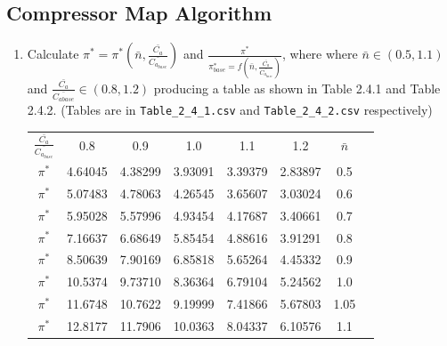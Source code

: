 \documentclass[titlepage]{article}
\begin{document}
\subsection{Compressor Map Algorithm}
\begin{enumerate}
    \item Calculate $\pi^{*} = \pi^{*} (\bar{n}, \frac{\bar{C_{a}}}{\bar{C_{a_{base}}}})$ and $\frac{\pi^{*}}{\pi^{*}_{base} = f (\bar{n}, \frac{\bar{C_{a}}}{\bar{C_{a_{base}}}})}$, where where $\bar{n} \in (0.5, 1.1)$ and $\frac{\bar{C_a}}{\bar{C_{a base}}} \in (0.8, 1.2)$ producing a table as shown in Table 2.4.1 and Table 2.4.2. (Tables are in \verb|Table_2_4_1.csv| and \verb|Table_2_4_2.csv| respectively)
    \begin{center}
        \begin{tabular}{ c c c c c c c c }
            $\frac{\bar{C_{a}}}{\bar{C_{a_{base}}}}$ & 0.8 & 0.9 & 1.0 & 1.1 & 1.2 & $\bar{n}$ \\
            $\pi^{*}$ & 4.64045 & 4.38299 & 3.93091 & 3.39379 & 2.83897 & 0.5 \\
            $\pi^{*}$ & 5.07483 & 4.78063 & 4.26545 & 3.65607 & 3.03024 & 0.6 \\
            $\pi^{*}$ & 5.95028 & 5.57996 & 4.93454 & 4.17687 & 3.40661 & 0.7 \\
            $\pi^{*}$ & 7.16637 & 6.68649 & 5.85454 & 4.88616 & 3.91291 & 0.8 \\
            $\pi^{*}$ & 8.50639 & 7.90169 & 6.85818 & 5.65264 & 4.45332 & 0.9 \\
            $\pi^{*}$ & 10.5374 & 9.73710 & 8.36364 & 6.79104 & 5.24562 & 1.0 \\
            $\pi^{*}$ & 11.6748 & 10.7622 & 9.19999 & 7.41866 & 5.67803 & 1.05 \\
            $\pi^{*}$ & 12.8177 & 11.7906 & 10.0363 & 8.04337 & 6.10576 & 1.1 \\
        \end{tabular}

        \vspace*{3pt}


\end{center}
\end{enumerate}
\end{document}
